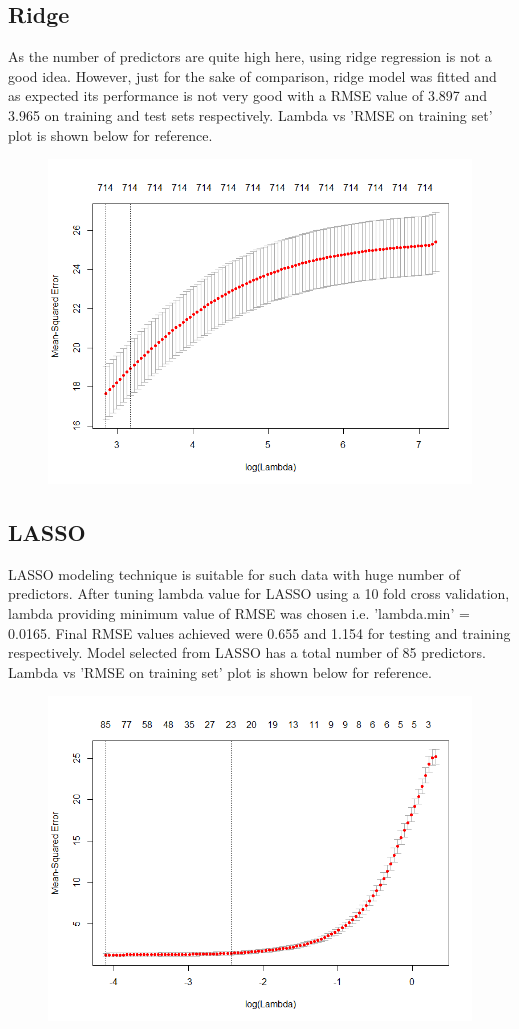 \documentclass[letterpaper,12pt]{article}
\begin{document}
\subsection{Ridge}
As the number of predictors are quite high here, using ridge regression is not a good idea. However, just for the sake of comparison, ridge model was fitted and as expected its performance is not very good with a RMSE value of 3.897 and 3.965 on training and test sets respectively. Lambda vs 'RMSE on training set' plot is shown below for reference.
\begin{figure}[H] 
        \centering \includegraphics[width=0.7\columnwidth]{ridgelambda.png}
\end{figure}

\subsection{LASSO}
LASSO modeling technique is suitable for such data with huge number of predictors. After tuning lambda value for LASSO using a 10 fold cross validation, lambda providing minimum value of RMSE was chosen i.e. 'lambda.min' = 0.0165. Final RMSE values achieved were 0.655 and 1.154 for testing and training respectively. Model selected from LASSO has a total number of 85 predictors. Lambda vs 'RMSE on training set' plot is shown below for reference.
\begin{figure}[H] 
        \centering \includegraphics[width=0.7\columnwidth]{LassoLambda.png}
\end{figure}
\end{document}
